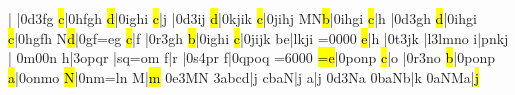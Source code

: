 \def\atnextline{\def\interfacteur{11}}%
\def\scalenoteskip{1.0}%
\relax
\generalmeter{\allabreve}\reprmorceau
\savemeters\noteskipLarge\saveclefs
\notes{}|\soupir\enotes
\temps\notes\hpause|\Ilegl0d\dqh3fg\enotes
\temps\notes{}\hl c|\qqh0hfgh\enotes
\xbarre\notes{}\hl d|\qqh0ighi\enotes
\temps\notes{}\hl c|\qu j\sk\enotes
\temps\notes|\Ilegl0d\dqh3ij\enotes
\xbarre\notes{}\hl d|\qqh0kjik\enotes
\temps\notes{}\hl c|\qqh0jihj\enotes
\xbarre\notes\zh M\lh N\hl b|\qqh0ihgi\enotes
\temps\notes{}\hl c|\qu h\enotes
\temps\notes|\Ilegl0d\dqh3gh\enotes
\Alaligne\notes{}\hl d|\qqh0ihgi\enotes
\temps\notes{}\hl c|\qqh0hgfh\enotes
\barre\notes{}\lh N\hl d|\qqh0gf{=e}g\enotes
\temps\notes{}\hl c|\qu f\sk\enotes
\temps\notes|\Ilegu0r\dqh3gh\enotes
\barre\notes{}\hl b|\qqh0ighi\enotes
\temps\notes{}\hl c|\qqh0jijk\enotes
\barre\notes\zh b\bohl e|lkji\enotes
\cleftoksi={{0}{0}{0}{0}}\changeclefs
\temps\notes{}\hl e|\qu h\sk\enotes
\temps\notes|\Ilegu0t\dqh3jk\enotes
\Alaligne\notes{}|\na l\qqb3lmno\enotes
\temps\notes{}\hu i|pnkj\enotes
\barre\nspace\notes{}|\relax
   \ibl0m0\tqb0n\enotes
\temps\notes{}\hu h|\qqb3opqr\enotes
\xbarre\notes{}|sq{=o}m\enotes
\temps\notes{}\hu f|\ql r\enotes
\temps\notes|\Ilegu0s\dqb4pr\enotes
\xbarre\notes{}\hu f|\qqB0qpoq\enotes
\cleftoksi={{6}{0}{0}{0}}\changeclefs
\temps\notes{}\hl{=e}|\qqB0ponp\enotes
\changecontexte
\Notes{}\hl c|\ql o\enotes
\temps\notes|\Ilegu0r\dqb3no\enotes
\temps\notes{}\hl b|\qqB0ponp\enotes
\temps\notes{}\hl a|\qqB0onmo\enotes
\generalmeter{\allabreve}\changecontexte
\notes{}\hl N|\qqB0nm{=l}n\enotes
\temps\Notes\boqu M|\hl m\enotes
\temps\notes{}\Ilegu0e\dqb3MN\enotes
\xbarre\notes\qqb3abcd|\hu j\enotes
\temps\notes{}cbaN|\hu j\enotes
\xbarre\Notes{}\ql a|\hu j\enotes
\temps\notes\Ilegu0d\dqb3Na\enotes
\temps\notes\qqb0baNb|\hu k\enotes%
\Alaligne\notes\qqB0aNMa|\hl j\enotes
